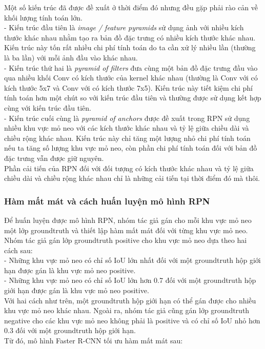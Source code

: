 {    \noindent
    Một số kiến trúc đã được đề xuất ở thời điểm đó nhưng đều gặp phải rào cản về khối lượng tính toán lớn. \\
    - Kiến trúc đầu tiên là \textit{image / feature pyramids} sử dụng ảnh với nhiều kích thước khác nhau nhằm tạo ra bản đồ đặc trưng có nhiều kích thước khác nhau.
    Kiến trúc này tốn rất nhiều chi phí tính toán do ta cần xử lý nhiều lần (thường là ba lần) với mỗi ảnh đầu vào khác nhau. \\
    - Kiến trúc thứ hai là \textit{pyramid of filters} đưa cùng một bản đồ đặc trưng đầu vào qua nhiều khối Conv có kích thước của kernel khác nhau (thường là Conv với có kích thước 5x7 và Conv với có kích thước 7x5).
    Kiến trúc này tiết kiệm chi phí tính toán hơn một chút so với kiến trúc đầu tiên và thường được sử dụng kết hợp cùng với kiến trúc đầu tiên. \\
    - Kiến trúc cuối cùng là \textit{pyramid of anchors} được đề xuất trong RPN sử dụng nhiều khu vực mỏ neo với các kích thước khác nhau và tỷ lệ giữa chiều dài và chiều rộng khác nhau.
    Kiến trúc này chỉ tăng một lượng nhỏ chi phí tính toán nếu ta tăng số lượng khu vực mỏ neo, còn phần chi phí tính toán đối với bản đồ đặc trưng vẫn được giữ nguyên. \\
    Phần cải tiến của RPN đối với đối tượng có kích thước khác nhau và tỷ lệ giữa chiều dài và chiều rộng khác nhau chỉ là những cải tiến tại thời điểm đó mà thôi.

    \subsubsection*{Hàm mất mát và cách huấn luyện mô hình RPN}
    Để huấn luyện được mô hình RPN, nhóm tác giả gán cho mỗi khu vực mỏ neo một lớp groundtruth và thiết lập hàm mất mát đối với từng khu vực mỏ neo.
    Nhóm tác giả gán lớp groundtruth positive cho khu vực mỏ neo dựa theo hai cách sau: \\
    - Những khu vực mỏ neo có chỉ số IoU lớn nhất đối với một groundtruth hộp giới hạn được gán là khu vực mỏ neo positive. \\
    - Những khu vực mỏ neo có chỉ số IoU lớn hơn 0.7 đối với một groundtruth hộp giới hạn được gán là khu vực mỏ neo positive. \\
    Với hai cách như trên, một groundtruth hộp giới hạn có thể gán được cho nhiều khu vực mỏ neo khác nhau.
    Ngoài ra, nhóm tác giả cũng gán lớp groundtruth negative cho các khu vực mỏ neo không phải là positive và có chỉ số IoU nhỏ hơn 0.3 đối với một groundtruth hộp giới hạn. \\
    Từ đó, mô hình Faster R-CNN tối ưu hàm mất mát sau:

}
